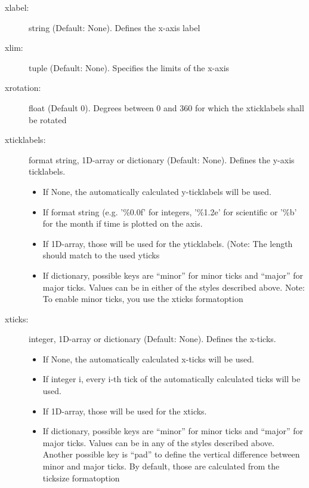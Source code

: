 \begin{description}
    \item[\gls*{xlabel}:] \label{item:xlabel}  string (Default: None). Defines the x-axis label
    \item[\gls*{xlim}:] \label{item:xlim}  tuple (Default: None). Specifies the limits of the x-axis
    \item[\gls*{xrotation}:] \label{item:xrotation}  float (Default 0). Degrees between 0 and 360 for which the xticklabels shall be rotated
    \item[\gls*{xticklabels}:] \label{item:xticklabels}  format string, 1D-array or dictionary (Default: None). Defines the y-axis ticklabels.
\begin{itemize}
    \item If None, the automatically calculated y-ticklabels will be used.
    \item If format string (e.g. '\%0.0f' for integers, '\%1.2e' for scientific or '\%b' for the month if time is plotted on the axis.
    \item If 1D-array, those will be used for the yticklabels. (Note: The length should match to the used yticks
    \item If dictionary, possible keys are \enquote{minor} for minor ticks and \enquote{major} for major ticks. Values can be in either of the styles described above. Note: To enable minor ticks, you use the xticks formatoption
\end{itemize}

    \item[\gls*{xticks}:] \label{item:xticks}  integer, 1D-array or dictionary (Default: None). Defines the x-ticks.
\begin{itemize}
    \item If None, the automatically calculated x-ticks will be used.
    \item If integer i, every i-th tick of the automatically calculated ticks will be used.
    \item If 1D-array, those will be used for the xticks.
    \item If dictionary, possible keys are \enquote{minor} for minor ticks and \enquote{major} for major ticks. Values can be in any of the styles described above. Another possible key is \enquote{pad} to define the vertical difference between minor and major ticks. By default, those are calculated from the ticksize formatoption
\end{itemize}


\end{description}

